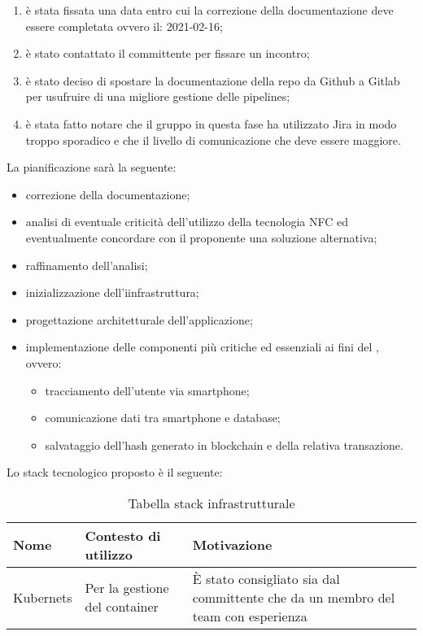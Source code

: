 \begin{enumerate}
    \item è stata fissata una data entro cui la correzione della documentazione deve essere completata ovvero il: 2021-02-16;
    \item è stato contattato il committente per fissare un incontro;
    \item è stato deciso di spostare la documentazione della repo da Github a Gitlab per usufruire di una migliore gestione delle pipelines;
    \item è stata fatto notare che il gruppo in questa fase ha utilizzato Jira in modo troppo sporadico e che il livello di 
    comunicazione che deve essere maggiore.
\end{enumerate}

    La pianificazione sarà la seguente:
    \begin{itemize}
    \item correzione della documentazione;
    \item analisi di eventuale criticità dell'utilizzo della tecnologia NFC ed eventualmente concordare con il proponente una soluzione alternativa;
    \item raffinamento dell'analisi;
    \item inizializzazione dell'iinfrastruttura;
    \item progettazione architetturale dell'applicazione;
    \item implementazione delle componenti più critiche ed essenziali ai fini del , ovvero:
        \begin{itemize}
            \item tracciamento dell'utente via smartphone;
            \item comunicazione dati tra smartphone e database;
            \item salvataggio dell'hash generato in blockchain e della relativa transazione.
        \end{itemize}
    \end{itemize}
    Lo stack tecnologico proposto è il seguente:
	\renewcommand{\arraystretch}{2}
    \begin{longtable}{ C{5cm} C{4cm} C{5cm} }
        \caption{Tabella stack infrastrutturale}                                                                                 \\
        \rowcolor{\primaryColor}
        \textcolor{\secondaryColor}{\textbf{Nome}} & \textcolor{\secondaryColor}{\textbf{Contesto di utilizzo}} & \textcolor{\secondaryColor}{\textbf{Motivazione}}\\ \endhead
        {Kubernets} & {Per la gestione del container}   & {È stato consigliato sia dal committente che da un membro del team con esperienza}\\
    \end{longtable}

